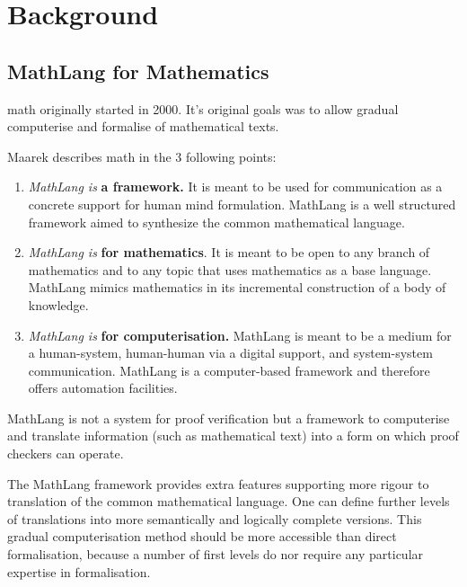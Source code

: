 \chapter{Background}
\label{ch:background}

\section{MathLang for Mathematics}
\label{sec:mathlangbackground}

\Gls{math} originally started in 2000. It's original goals was to allow gradual \gls{computerise} and \gls{formalise} of mathematical texts.

Maarek \cite{manuelphd} describes \gls{math} in the 3 following points:

\begin{enumerate}
\item \textit{MathLang is} \textbf{a framework.} It is meant to be used for communication as a concrete support for human mind formulation. MathLang is a well structured framework aimed to synthesize the common mathematical language.

\item \textit{MathLang is} \textbf{for mathematics}. It is meant to be open to any branch of mathematics and to any topic that uses mathematics as a base language. MathLang mimics mathematics in its incremental construction of a body of knowledge.

\item \textit{MathLang is} \textbf{for computerisation.} MathLang is meant to be a medium for a human-system, human-human via a digital support, and system-system communication. MathLang is a computer-based framework and therefore offers automation facilities.

\end{enumerate}

MathLang is not a system for proof verification but a framework to computerise and translate information (such as mathematical text) into a form on which proof checkers can operate.

The MathLang framework provides extra features supporting more rigour to translation of the common mathematical language. One can define further levels of translations into more semantically and logically complete versions. This gradual computerisation method should be more accessible than direct formalisation, because a number of first levels do nor require any particular expertise in formalisation.

